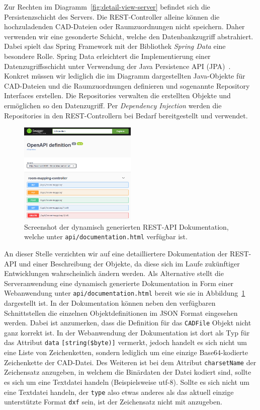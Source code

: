Zur Rechten im Diagramm~\ref{fig:detail-view-server} befindet sich die Persistenzschicht des Servers.
Die REST-Controller alleine können die hochzuladenden CAD-Dateien oder Raumzuordnungen nicht speichern.
Daher verwenden wir eine gesonderte Schicht, welche den Datenbankzugriff abstrahiert.
Dabei spielt das Spring Framework mit der Bibliothek \textit{Spring Data} eine besondere Rolle.
Spring Data erleichtert die Implementierung einer Datenzugriffsschicht unter Verwendung der Java Persistence API (JPA)~\cite{SpringData}.
Konkret müssen wir lediglich die im Diagramm dargestellten Java-Objekte für CAD-Dateien und die Raumzuordnungen definieren und sogenannte Repository Interfaces erstellen.
Die Repositories verwalten die erstellten Objekte und ermöglichen so den Datenzugriff.
Per \textit{Dependency Injection} werden die Repositories in den REST-Controllern bei Bedarf bereitgestellt und verwendet.

\begin{figure}
    \includegraphics[width=0.5\textwidth]{res/screenshot-docs.png}
    \caption{Screenshot der dynamisch generierten REST-API Dokumentation, welche unter \texttt{api/documentation.html} verfügbar ist.}
    \label{fig:screenshot-docs}
\end{figure}

An dieser Stelle verzichten wir auf eine detailliertere Dokumentation der REST-API und einer Beschreibung der Objekte, da diese sich im Laufe zukünftiger Entwicklungen wahrscheinlich ändern werden.
Als Alternative stellt die Serveranwendung eine dynamisch generierte Dokumentation in Form einer Webanwendung unter \texttt{api/documentation.html} bereit wie sie in Abbildung~\ref{fig:screenshot-docs} dargestellt ist.
In der Dokumentation können neben den verfügbaren Schnittstellen die einzelnen Objektdefinitionen im JSON Format eingesehen werden.
Dabei ist anzumerken, dass die Definition für das \texttt{CADFile} Objekt nicht ganz korrekt ist.
In der Webanwendung der Dokumentation ist dort als Typ für das Attribut \texttt{data} \texttt{[string(\$byte)]} vermerkt, jedoch handelt es sich nicht um eine Liste von Zeichenketten, sondern lediglich um eine einzige Base64-kodierte Zeichenkette der CAD-Datei.
Des Weiteren ist bei dem Attribut \texttt{charsetName} der Zeichensatz anzugeben, in welchem die Binärdaten der Datei kodiert sind, sollte es sich um eine Textdatei handeln (Beispielsweise \glqq{}utf-8\grqq{}).
Sollte es sich nicht um eine Textdatei handeln, der \texttt{type} also etwas anderes als das aktuell einzige unterstützte Format \texttt{dxf} sein, ist der Zeichensatz nicht mit anzugeben.

